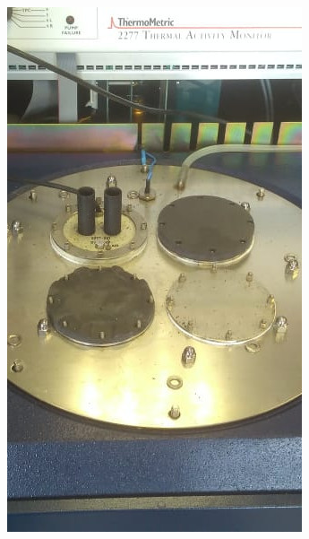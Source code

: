 \begin{figure}[h]
\begin{subfigure}{0.24\linewidth}
			\includegraphics[width=\linewidth]{Figures/process/p2}
			\caption{ }
			\label{fig: subD}
		\end{subfigure}
		\begin{subfigure}{0.24\linewidth}

\end{subfigure}
\end{figure}
